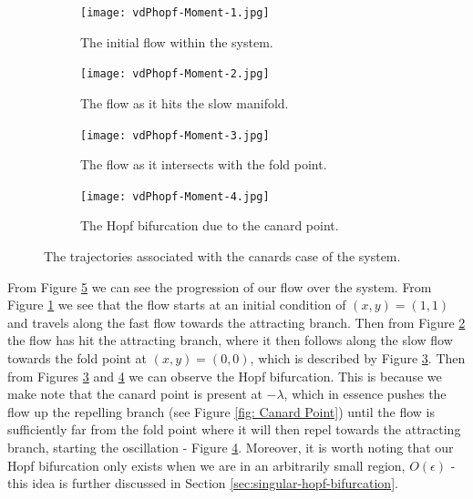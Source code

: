 \begin{figure}[h!]
	\centering
	\begin{subfigure}[t]{0.45\textwidth}
		\centering
		\texttt{[image: vdPhopf-Moment-1.jpg]}
		\caption{The initial flow within the system.} \label{fig:timing1}
	\end{subfigure}
	\hfill
	\begin{subfigure}[t]{0.45\textwidth}
		\centering
		\texttt{[image: vdPhopf-Moment-2.jpg]}
		\caption{The flow as it hits the slow manifold.} \label{fig:timing2}
	\end{subfigure}
	
	\vspace{1cm}
	\begin{subfigure}[t]{0.45\textwidth}
		\centering
		\texttt{[image: vdPhopf-Moment-3.jpg]}
		\caption{The flow as it intersects with the fold point.} \label{fig:timing3}
	\end{subfigure}
	\hfill
	\begin{subfigure}[t]{0.45\textwidth}\centering
		\texttt{[image: vdPhopf-Moment-4.jpg]}
		\caption{The Hopf bifurcation due to the canard point.}\label{fig:timing4}
	\end{subfigure}
	\caption{The trajectories associated with the canards case of the \vdp system.}
	\label{fig: 4 canard }
\end{figure}
From Figure \ref{fig: 4 canard } we can see the progression of our flow over the system. From Figure \ref{fig:timing1} we see that the flow starts at an initial condition of $ (x,y)=(1,1) $ and travels along the fast flow towards the attracting branch. Then from Figure \ref{fig:timing2} the flow has hit the attracting branch, where it then follows along the slow flow towards the fold point at $ (x,y)=(0,0) $, which is described by Figure \ref{fig:timing3}. Then from Figures \ref{fig:timing3} and \ref{fig:timing4} we can observe the Hopf bifurcation. This is because we make note that the canard point is present at $ -\lambda $, which in essence pushes the flow up the repelling branch (see Figure \ref{fig: Canard Point}) until the flow is sufficiently far from the fold point where it will then repel towards the attracting branch, starting the oscillation - Figure \ref{fig:timing4}. Moreover, it is worth noting that our Hopf bifurcation only exists when we are in an arbitrarily small region, $ O(\epsilon) $ \cite{Eckhaus} - this idea is further discussed in Section \ref{sec:singular-hopf-bifurcation}.

